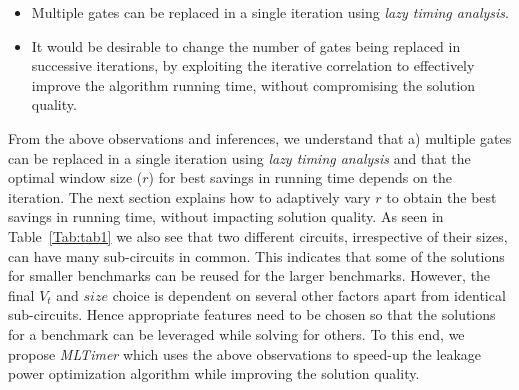 \begin{itemize}
\item Multiple gates can be replaced in a single iteration using {\it lazy timing analysis}.
\item It would be desirable to change the number of gates being replaced  in successive iterations, by exploiting the iterative correlation to 
effectively improve the algorithm running time, without compromising the solution quality.
\end{itemize}





\noindent From the above observations and inferences, we understand that a) multiple gates can be replaced 
in a single iteration using {\em lazy timing analysis} and that the optimal window size ($r$) for best 
savings in running time depends on the iteration. The next section explains how to adaptively vary $r$ to obtain the best savings in running time, without impacting solution quality. As seen in Table~\ref{Tab:tab1} we also see that two different circuits, irrespective of their sizes, can have many sub-circuits in common. This indicates that some of the solutions for smaller benchmarks can be reused for the larger benchmarks. However, the final $V_t$ and $size$ choice is dependent on several other factors apart from identical sub-circuits. Hence appropriate features need to be chosen so that the solutions for a benchmark can be leveraged while solving for others. To this end, we propose \textit{MLTimer} which uses the above observations to speed-up the leakage power optimization algorithm while improving the solution quality.
